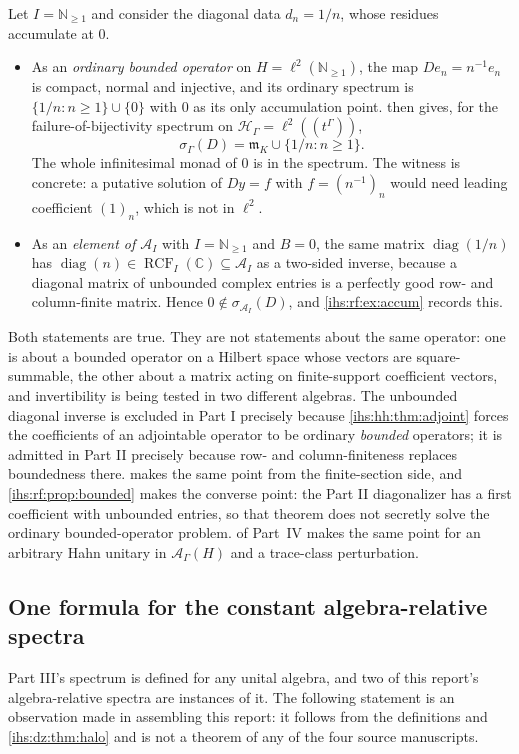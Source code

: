 \documentclass[11pt,a4paper]{article}
\numberwithin{equation}{section}
\theoremstyle{definition}
\theoremstyle{remark}
\newcommand{\C}{\mathbb C}
\newcommand{\N}{\mathbb N}
\newcommand{\mK}{\mathfrak m_K}
\newcommand{\Hil}{\mathcal H_\Gamma}
\newcommand{\Ahh}{\mathcal A_\Gamma(H)}
\newcommand{\Arf}{\mathcal A_I}
\newcommand{\diag}{\operatorname{diag}}
\newcommand{\RCF}{\operatorname{RCF}}
\begin{document}
Let $I=\N_{\ge1}$ and consider the diagonal data $d_n=1/n$, whose residues
accumulate at $0$.
\begin{itemize}
\item As an \emph{ordinary bounded operator} on $H=\ell^2(\N_{\ge1})$, the
map $De_n=n^{-1}e_n$ is compact, normal and injective, and its ordinary
spectrum is $\{1/n:n\ge1\}\cup\{0\}$ with $0$ as its only accumulation
point.  then gives, for the failure-of-bijectivity
spectrum on $\Hil=\ell^2((t^\Gamma))$,
\[
 \sigma_\Gamma(D)=\mK\cup\{1/n:n\ge1\}.
\]
The whole infinitesimal monad of $0$ is in the spectrum. The witness is
concrete: a putative solution of $Dy=f$ with $f=(n^{-1})_n$ would need
leading coefficient $(1)_n$, which is not in $\ell^2$.
\item As an \emph{element of $\Arf$} with $I=\N_{\ge1}$ and $B=0$, the same
matrix $\diag(1/n)$ has $\diag(n)\in\RCF_I(\C)\subseteq\Arf$ as a two-sided
inverse, because a diagonal matrix of unbounded complex entries is a
perfectly good row- and column-finite matrix. Hence
$0\notin\sigma_{\Arf}(D)$, and \cref{ihs:rf:ex:accum} records this.
\end{itemize}
Both statements are true. They are not statements about the same operator:
one is about a bounded operator on a Hilbert space whose vectors are
square-summable, the other about a matrix acting on finite-support
coefficient vectors, and invertibility is being tested in two different
algebras. The unbounded diagonal inverse is excluded in Part I precisely
because \cref{ihs:hh:thm:adjoint} forces the coefficients of an adjointable
operator to be ordinary \emph{bounded} operators; it is admitted in Part II
precisely because row- and column-finiteness replaces boundedness there.
 makes the same point from the finite-section
side, and \cref{ihs:rf:prop:bounded} makes the converse point: the Part II
diagonalizer has a first coefficient with unbounded entries, so that theorem
does not secretly solve the ordinary bounded-operator problem.
 of Part~IV makes the same point for an arbitrary
Hahn unitary in $\Ahh$ and a trace-class perturbation.

\subsection{One formula for the constant algebra-relative spectra}\label{ihs:sec:unify}
Part III's spectrum is defined for any unital algebra, and two of this
report's algebra-relative spectra are instances of it. The following
statement is an observation made in assembling this report: it follows from
the definitions and \cref{ihs:dz:thm:halo} and is not a theorem of any of
the four source manuscripts.
\end{document}
